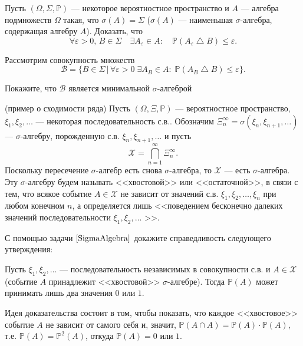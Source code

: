 \begin{problem}
\label{SigmaAlgebra}
Пусть $(\Omega,\Sigma,{\mathbb P})$ --- некоторое вероятностное пространство и $A$ --- алгебра подмножеств $\Omega$ такая, что 
$\sigma(A)=\Sigma$ ($\sigma(A)$ --- наименьшая $\sigma$-алгебра, содержащая алгебру $A$). Доказать, что 
$$
\forall\varepsilon>0,\, B\in\Sigma\quad \exists A_{\varepsilon}\in A:\quad {\mathbb P}(A_{\varepsilon}\bigtriangleup B)
\leqslant\varepsilon . 
$$
\end{problem}

\begin{ordre}
Рассмотрим совокупность множеств 
$$
{\mathcal B}=\bigl\{ B\in\Sigma\, | \, \forall\varepsilon>0 \; \exists A_B\in A:\; {\mathbb P}(A_B\bigtriangleup B)
\leqslant\varepsilon \bigr\} . 
$$

Покажите, что ${\mathcal B}$ является минимальной $\sigma$-алгеброй 

\end{ordre}

\begin{problem} (пример о сходимости ряда)
Пусть $(\Omega,\Xi,{\mathbb P})$ --- вероятностное пространство, $\xi_1,\xi_2,\ldots$ --- некоторая последовательность с.в.. 
Обозначим $\Xi_n^{\infty}=\sigma(\xi_{n},\xi_{n+1},\ldots)$ --- $\sigma$-алгебру, порожденную с.в. $\xi_{n},\xi_{n+1},\ldots$ и пусть 
$$
{\mathcal X}=\bigcap\limits_{n=1}^{\infty} \Xi_{n}^{\infty} . 
$$
Поскольку пересечение $\sigma$-алгебр есть снова $\sigma$-алгебра, то ${\mathcal X}$ --- есть $\sigma$-алгебра. Эту $\sigma$-алгебру 
будем называть <<хвостовой>> или <<остаточной>>, в связи с тем, что всякое событие $A\in{\mathcal X}$ не зависит от значений с.в. 
$\xi_1,\xi_2,\ldots,\xi_n$ при любом конечном $n$, а определяется лишь <<поведением бесконечно далеких значений последовательности 
$\xi_1,\xi_2,\ldots$ >>. 

С помощью задачи $\ref{SigmaAlgebra}$ докажите справедливость следующего утверждения: 

Пусть $\xi_1,\xi_2,\ldots$ --- последовательность независимых в совокупности с.в. и $A\in{\mathcal X}$ 
(событие $A$ принадлежит <<хвостовой>> $\sigma$-алгебре). Тогда ${\mathbb P}(A)$ может принимать лишь два значения $0$ или $1$. 
\end{problem}

\begin{ordre}
Идея доказательства состоит в том, чтобы показать, что каждое <<хвостовое>> событие $A$ не зависит от самого себя и, значит, 
${\mathbb P}(A\cap A)={\mathbb P}(A)\cdot {\mathbb P}(A)$, т.е. ${\mathbb P}(A)={\mathbb P}^2(A)$, откуда 
${\mathbb P}(A)=0$ или $1$. 
\end{ordre}